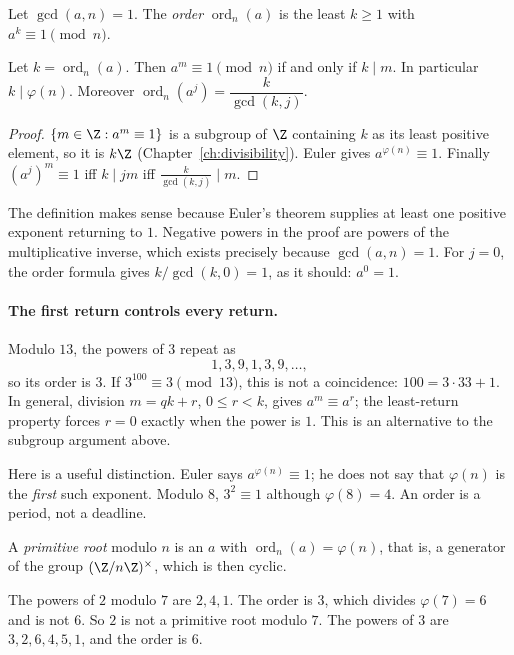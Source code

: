 \begin{definition}
Let $\gcd(a,n)=1$. The \emph{order} $\operatorname{ord}_n(a)$ is the least $k\ge1$ with $a^k\equiv1\pmod n$.
\end{definition}

\begin{proposition}\label{prop:order}
Let $k=\operatorname{ord}_n(a)$. Then $a^m\equiv1\pmod n$ if and only if $k\mid m$. In particular $k\mid\varphi(n)$. Moreover $\operatorname{ord}_n(a^j)=\dfrac k{\gcd(k,j)}$.
\end{proposition}
\begin{proof}
$\{m\in\Z:a^m\equiv1\}$ is a subgroup of $\Z$ containing $k$ as its least positive element, so it is $k\Z$ (Chapter~\ref{ch:divisibility}). Euler gives $a^{\varphi(n)}\equiv1$. Finally $(a^j)^m\equiv1$ iff $k\mid jm$ iff $\frac k{\gcd(k,j)}\mid m$.
\end{proof}

The definition makes sense because Euler's theorem supplies at least one
positive exponent returning to $1$. Negative powers in the proof are powers
of the multiplicative inverse, which exists precisely because $\gcd(a,n)=1$.
For $j=0$, the order formula gives $k/\gcd(k,0)=1$, as it should: $a^0=1$.

\paragraph{The first return controls every return.}
Modulo $13$, the powers of $3$ repeat as
\[
1,3,9,1,3,9,\dots,
\]
so its order is $3$.
If $3^{100}\equiv3\pmod{13}$, this is not a coincidence:
$100=3\cdot33+1$. In general, division $m=qk+r$, $0\le r<k$, gives
$a^m\equiv a^r$; the least-return property forces $r=0$ exactly when the
power is $1$. This is an alternative to the subgroup argument above.

Here is a useful distinction. Euler says $a^{\varphi(n)}\equiv1$; he does
not say that $\varphi(n)$ is the \emph{first} such exponent. Modulo $8$,
$3^2\equiv1$ although $\varphi(8)=4$. An order is a period, not a deadline.

A \emph{primitive root} modulo $n$ is an $a$ with $\operatorname{ord}_n(a)=\varphi(n)$, that is, a generator of the group $(\Z/n\Z)^\times$, which is then cyclic.

\begin{examplex}
The powers of $2$ modulo $7$ are $2,4,1$. The order is $3$, which divides $\varphi(7)=6$ and is not $6$. So $2$ is not a primitive root modulo $7$. The powers of $3$ are $3,2,6,4,5,1$, and the order is $6$.
\end{examplex}

